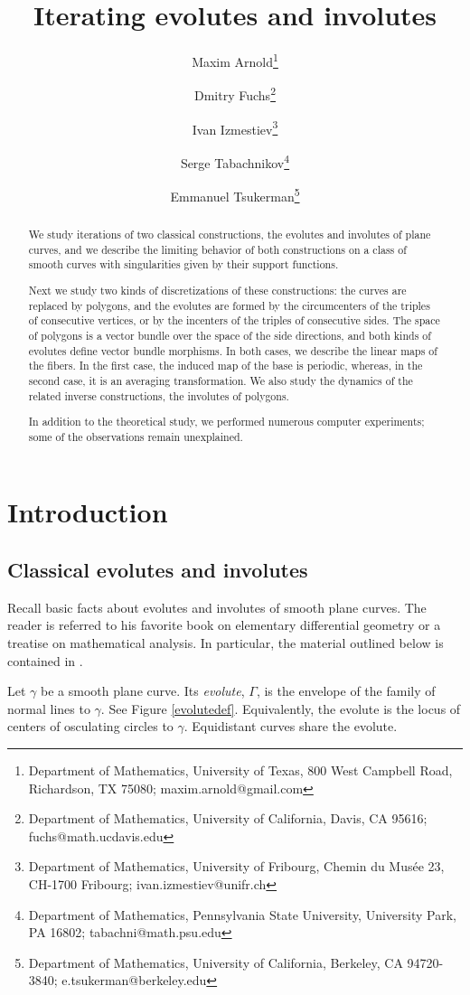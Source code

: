 \documentclass[12pt]{article}
\title{Iterating evolutes and involutes}
\author{Maxim Arnold\footnote{
Department of Mathematics, 
University of Texas, 
800 West Campbell Road,
Richardson, TX 75080;
maxim.arnold@gmail.com}
\and
Dmitry Fuchs\footnote{
Department of Mathematics, 
University of California, 
Davis, CA 95616;
 fuchs@math.ucdavis.edu}
\and
Ivan Izmestiev\footnote{
Department of Mathematics, 
University of Fribourg,
Chemin du Mus\'ee 23,
CH-1700 Fribourg;
ivan.izmestiev@unifr.ch 
}
\and
Serge Tabachnikov\footnote{
Department of Mathematics,
Pennsylvania State University,
University Park, PA 16802;
tabachni@math.psu.edu}
\and
Emmanuel Tsukerman\footnote{
Department of Mathematics, 
University of California,
Berkeley, CA 94720-3840;
e.tsukerman@berkeley.edu}
}
\date{}
\newcommand{\g}{{\gamma}}
\newcommand{\G}{{\Gamma}}
\begin{document}
\maketitle

\begin{abstract}
We study iterations of two classical constructions, the evolutes and involutes of plane curves, and we describe the limiting behavior of both constructions on a class of smooth curves with singularities given by their support functions.  

Next we study two kinds of discretizations of these constructions: the curves are replaced by polygons, and the evolutes are formed by the circumcenters of the triples of consecutive vertices, or by the incenters of the triples of consecutive sides. The space of polygons is a vector bundle over the space of the side directions, and both kinds of evolutes define vector bundle morphisms. 
In both cases, we describe the linear maps of the fibers. In the first case, the induced map of the base is periodic, whereas, in the second case, it is an averaging transformation. We also study the dynamics of the related inverse constructions, the involutes of polygons.

In addition to the theoretical study, we performed numerous computer experiments; some of the observations remain unexplained.
\end{abstract}

\setcounter{tocdepth}{2}
\tableofcontents

\section{Introduction }\label{Intro}

\subsection{Classical evolutes and involutes}\label{classical}
Recall basic facts about evolutes and involutes of smooth plane curves. The reader is referred to his favorite book on elementary differential geometry or a treatise on mathematical analysis. In particular, the material outlined below is contained in \cite{FT}.

Let $\g$ be a smooth plane curve. Its {\it evolute}, $\G$, is the envelope of  the family of normal lines to $\g$. See Figure \ref{evolutedef}.
Equivalently, the evolute is the  locus of centers of osculating circles to $\g$.  Equidistant curves share the evolute. 
\end{document}
